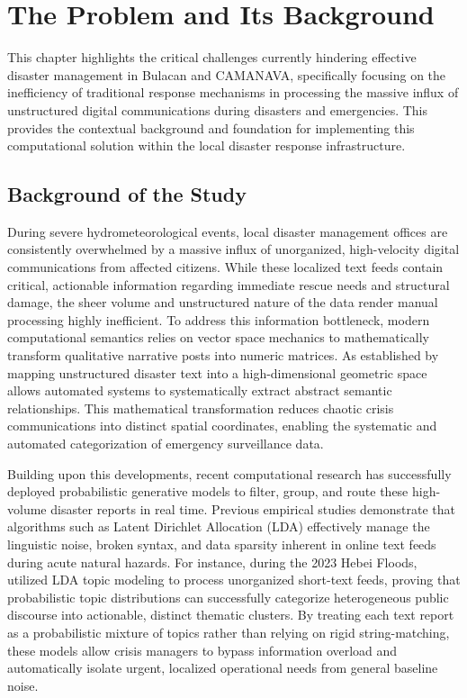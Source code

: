 \chapter{The Problem and Its Background}

This chapter highlights the critical challenges currently hindering effective
disaster management in Bulacan and CAMANAVA, specifically focusing on the
inefficiency of traditional response mechanisms in processing the massive
influx of unstructured digital communications during disasters and
emergencies. This provides the contextual background and foundation for
implementing this computational solution within the local disaster response
infrastructure.

\section*{Background of the Study}

During severe hydrometeorological events, local disaster management offices
are consistently overwhelmed by a massive influx of unorganized, high-velocity
digital communications from affected citizens. While these localized text
feeds contain critical, actionable information regarding immediate rescue
needs and structural damage, the sheer volume and unstructured nature of the
data render manual processing highly inefficient. To address this information
bottleneck, modern computational semantics relies on vector space mechanics to
mathematically transform qualitative narrative posts into numeric matrices. As
established by \textcite{mihunov2022} mapping unstructured disaster text into a
high-dimensional geometric space allows automated systems to systematically
extract abstract semantic relationships. This mathematical transformation
reduces chaotic crisis communications into distinct spatial coordinates,
enabling the systematic and automated categorization of emergency surveillance
data.

Building upon this developments, recent computational research
has successfully deployed probabilistic generative models to filter, group,
and route these high-volume disaster reports in real time. Previous empirical
studies demonstrate that algorithms such as Latent Dirichlet Allocation (LDA)
effectively manage the linguistic noise, broken syntax, and data sparsity
inherent in online text feeds during acute natural hazards. For instance,
during the 2023 Hebei Floods, \textcite{zang2026} utilized LDA topic modeling to
process unorganized short-text feeds, proving that probabilistic topic
distributions can successfully categorize heterogeneous public discourse into
actionable, distinct thematic clusters. By treating each text report as a
probabilistic mixture of topics rather than relying on rigid
string-matching, these models allow crisis managers to bypass information
overload and automatically isolate urgent, localized operational needs from
general baseline noise.

